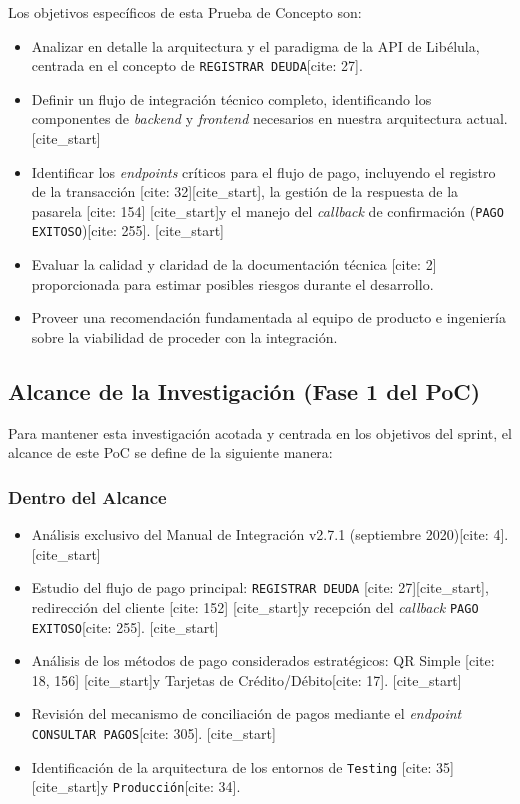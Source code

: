         Los objetivos específicos de esta Prueba de Concepto son:
            \begin{itemize}
                [cite_start]\item Analizar en detalle la arquitectura y el paradigma de la API de Libélula, centrada en el concepto 
                de \texttt{REGISTRAR DEUDA}[cite: 27].
                \item Definir un flujo de integración técnico completo, identificando los componentes de \emph{backend} y 
                \emph{frontend} necesarios en nuestra arquitectura actual.
                [cite_start]\item Identificar los \emph{endpoints} críticos para el flujo de pago, incluyendo el registro de 
                la transacción [cite: 32][cite_start], la gestión de la respuesta de la pasarela [cite: 154] [cite_start]y el 
                manejo del \emph{callback} de confirmación (\texttt{PAGO EXITOSO})[cite: 255].
                [cite_start]\item Evaluar la calidad y claridad de la documentación técnica [cite: 2] proporcionada para estimar 
                posibles riesgos durante el desarrollo.
                \item Proveer una recomendación fundamentada al equipo de producto e ingeniería sobre la viabilidad de proceder 
                con la integración.
            \end{itemize}

    \subsection{Alcance de la Investigación (Fase 1 del PoC)}
    Para mantener esta investigación acotada y centrada en los objetivos del sprint, el alcance de este PoC se define de la 
    siguiente manera:

        \subsubsection*{Dentro del Alcance}
        \begin{itemize}
            [cite_start]\item Análisis exclusivo del Manual de Integración v2.7.1 (septiembre 2020)[cite: 4].
            [cite_start]\item Estudio del flujo de pago principal: \texttt{REGISTRAR DEUDA} [cite: 27][cite_start], 
            redirección del cliente [cite: 152] [cite_start]y recepción del \emph{callback} \texttt{PAGO EXITOSO}[cite: 255].
            [cite_start]\item Análisis de los métodos de pago considerados estratégicos: QR Simple [cite: 18, 156] [cite_start]y 
            Tarjetas de Crédito/Débito[cite: 17].
            [cite_start]\item Revisión del mecanismo de conciliación de pagos mediante el \emph{endpoint} 
            \texttt{CONSULTAR PAGOS}[cite: 305].
            [cite_start]\item Identificación de la arquitectura de los entornos de \texttt{Testing} [cite: 35] [cite_start]y 
            \texttt{Producción}[cite: 34].
        \end{itemize}

